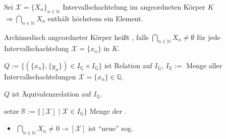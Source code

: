 \begin{lemma}
	Sei $\mathcal{X} = \{X_n\}_{n\in\mathbb{N}}$ Intervallschachtelung im angeordneten Körper $K$\\
	$\Rightarrow \bigcap_{n\in\mathbb{N}} X_n$ enthält höchstens ein Element.
\end{lemma}

\begin{definition}
	Archimedisch angeordneter Körper heißt , falls $\bigcap_{n\in\mathbb{N}} X_n\neq \emptyset$ für jede Intervallschachtelung $\mathcal{X} = \{x_n\}$ in $K$.
\end{definition}

\begin{definition}
	$Q:=\{ (\{x_n\}, \{y_n\})\in I_\mathbb{Q}\times I_\mathbb{Q} \}$ ist Relation auf $I_\mathbb{Q}$, $I_\mathbb{Q}:=$ Menge aller Intervallschachtelungen $\mathcal{X}=\{x_n\} \in \mathbb{Q}$.
\end{definition}

\begin{proposition}
	$Q$ ist Äquivalenzrelation auf $I_\mathbb{Q}$.
\end{proposition}

\begin{definition}
	setze $\mathbb{R} := \{ [\mathcal{X}] \mid \mathcal{X}\in I_\mathbb{Q} \}$ Menge der .
	
	\begin{itemize}
		\item $\bigcap_{n\in\mathbb{N}} X_n \neq 0 \rightarrow [\mathcal{X}]$ ist "`neue"' sog. 
	\end{itemize}
\end{definition}

